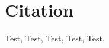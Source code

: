 \chapter{Citation}

Test\cite{mittelbach04},
Test\cite{lamport94, knuth86a},
Test\cite{knuth86a,lamport94,mittelbach04},
Test\cite{刘海洋2013},
Test\cite{knuth84}.
